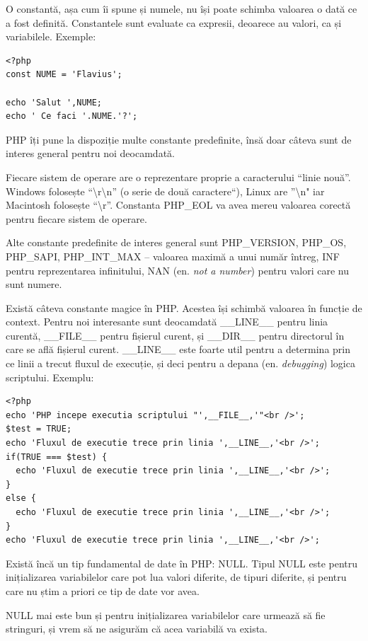 O constantă, așa cum îi spune și numele, nu își poate schimba valoarea o dată
ce a fost definită. Constantele sunt evaluate ca expresii, deoarece au valori,
ca și variabilele. Exemple:
\begin{lstlisting}
<?php
const NUME = 'Flavius';

echo 'Salut ',NUME;
echo ' Ce faci '.NUME.'?';
\end{lstlisting}

PHP îți pune la dispoziție multe constante predefinite, însă doar
câteva sunt de interes general
pentru noi deocamdată.

Fiecare sistem de operare  are o reprezentare proprie
a caracterului ``linie nouă''. Windows folosește ``{\textbackslash}r{\textbackslash}n'' (o
serie de două caractere``), Linux are ''{\textbackslash}n" iar Macintosh folosește
``{\textbackslash}r''. Constanta PHP\_EOL va avea mereu valoarea corectă pentru
fiecare sistem de operare.

Alte constante predefinite de interes general sunt PHP\_VERSION, PHP\_OS,
PHP\_SAPI, PHP\_INT\_MAX -- valoarea maximă a unui număr întreg, INF pentru
reprezentarea infinitului, NAN (en. \textsl{not a number}) pentru valori
care nu sunt numere.

Există câteva constante magice în PHP. Acestea își schimbă valoarea
în funcție de context. Pentru noi interesante sunt deocamdată
\_\_LINE\_\_ pentru linia curentă, \_\_FILE\_\_ pentru fișierul
curent, și \_\_DIR\_\_ pentru directorul în care se află fișierul curent.
\_\_LINE\_\_ este foarte util pentru a determina prin ce linii 
a trecut fluxul de execuție, și deci pentru a depana (en. \textsl{debugging})
logica scriptului. Exemplu:
\begin{lstlisting}
<?php
echo 'PHP incepe executia scriptului "',__FILE__,'"<br />';
$test = TRUE;
echo 'Fluxul de executie trece prin linia ',__LINE__,'<br />';
if(TRUE === $test) {
  echo 'Fluxul de executie trece prin linia ',__LINE__,'<br />';
}
else {
  echo 'Fluxul de executie trece prin linia ',__LINE__,'<br />';
}
echo 'Fluxul de executie trece prin linia ',__LINE__,'<br />';
\end{lstlisting}

Există încă un tip fundamental de date în PHP: NULL. Tipul NULL
este pentru inițializarea variabilelor care pot lua valori diferite, de tipuri
diferite, și pentru care nu știm a priori ce tip de date vor avea.

NULL mai este bun și pentru inițializarea variabilelor care urmează să fie
stringuri, și vrem să ne asigurăm că acea variabilă va exista.

